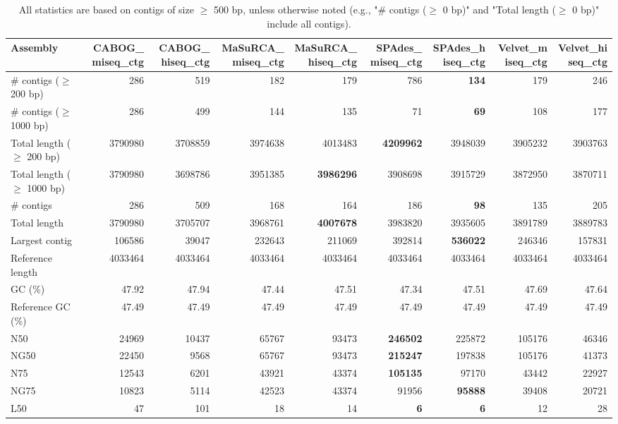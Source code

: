 \documentclass[12pt,a4paper]{article}
\begin{document}
\begin{table}[ht]
\begin{center}
\caption{All statistics are based on contigs of size $\geq$ 500 bp, unless otherwise noted (e.g., "\# contigs ($\geq$ 0 bp)" and "Total length ($\geq$ 0 bp)" include all contigs).}
\begin{tabular}{|l*{8}{|r}|}
\hline
Assembly & CABOG\_miseq\_ctg & CABOG\_hiseq\_ctg & MaSuRCA\_miseq\_ctg & MaSuRCA\_hiseq\_ctg & SPAdes\_miseq\_ctg & SPAdes\_hiseq\_ctg & Velvet\_miseq\_ctg & Velvet\_hiseq\_ctg \\ \hline
\# contigs ($\geq$ 200 bp) & 286 & 519 & 182 & 179 & 786 & {\bf 134} & 179 & 246 \\ \hline
\# contigs ($\geq$ 1000 bp) & 286 & 499 & 144 & 135 & 71 & {\bf 69} & 108 & 177 \\ \hline
Total length ($\geq$ 200 bp) & 3790980 & 3708859 & 3974638 & 4013483 & {\bf 4209962} & 3948039 & 3905232 & 3903763 \\ \hline
Total length ($\geq$ 1000 bp) & 3790980 & 3698786 & 3951385 & {\bf 3986296} & 3908698 & 3915729 & 3872950 & 3870711 \\ \hline
\# contigs & 286 & 509 & 168 & 164 & 186 & {\bf 98} & 135 & 205 \\ \hline
Total length & 3790980 & 3705707 & 3968761 & {\bf 4007678} & 3983820 & 3935605 & 3891789 & 3889783 \\ \hline
Largest contig & 106586 & 39047 & 232643 & 211069 & 392814 & {\bf 536022} & 246346 & 157831 \\ \hline
Reference length & 4033464 & 4033464 & 4033464 & 4033464 & 4033464 & 4033464 & 4033464 & 4033464 \\ \hline
GC (\%) & 47.92 & 47.94 & 47.44 & 47.51 & 47.34 & 47.51 & 47.69 & 47.64 \\ \hline
Reference GC (\%) & 47.49 & 47.49 & 47.49 & 47.49 & 47.49 & 47.49 & 47.49 & 47.49 \\ \hline
N50 & 24969 & 10437 & 65767 & 93473 & {\bf 246502} & 225872 & 105176 & 46346 \\ \hline
NG50 & 22450 & 9568 & 65767 & 93473 & {\bf 215247} & 197838 & 105176 & 41373 \\ \hline
N75 & 12543 & 6201 & 43921 & 43374 & {\bf 105135} & 97170 & 43442 & 22927 \\ \hline
NG75 & 10823 & 5114 & 42523 & 43374 & 91956 & {\bf 95888} & 39408 & 20721 \\ \hline
L50 & 47 & 101 & 18 & 14 & {\bf 6} & {\bf 6} & 12 & 28 \\ \hline

\end{tabular}
\end{center}
\end{table}
\end{document}
